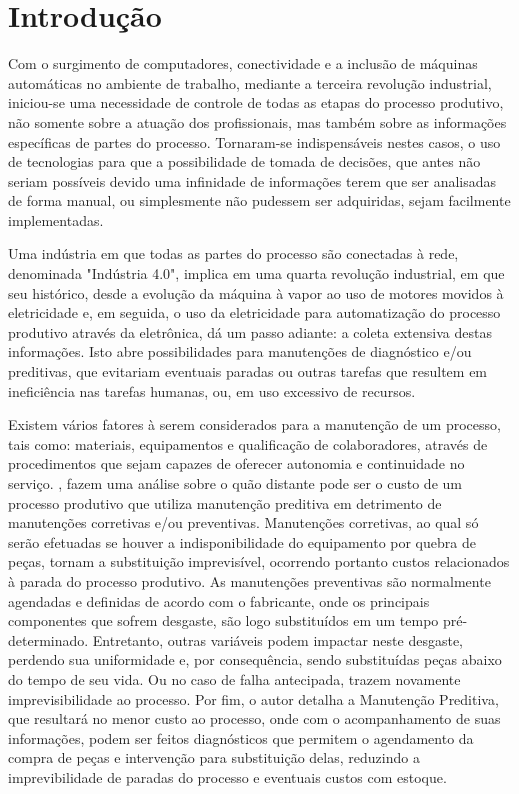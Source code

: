 \chapter{Introdução}
\label{chap:introducao}

Com o surgimento de computadores, conectividade e a inclusão de máquinas automáticas no ambiente de trabalho, mediante a terceira revolução industrial, iniciou-se uma necessidade de controle de todas as etapas do processo produtivo, não somente sobre a atuação dos profissionais, mas também sobre as informações específicas de partes do processo. Tornaram-se indispensáveis nestes casos, o uso de tecnologias para que a possibilidade de tomada de decisões, que antes não seriam possíveis devido uma infinidade de informações terem que ser analisadas de forma manual, ou simplesmente não pudessem ser adquiridas, sejam facilmente implementadas.

Uma indústria em que todas as partes do processo são conectadas à rede, denominada "Indústria 4.0", implica em uma quarta revolução industrial, em que seu histórico, desde a evolução da máquina à vapor ao uso de motores movidos à eletricidade e, em seguida, o uso da eletricidade para automatização do processo produtivo através da eletrônica, dá um passo adiante: a coleta extensiva destas informações. Isto abre possibilidades para manutenções de diagnóstico e/ou preditivas, que evitariam eventuais paradas ou outras tarefas que resultem em ineficiência nas tarefas humanas, ou, em uso excessivo de recursos.

Existem vários fatores à serem considerados para a manutenção de um processo, tais como: materiais, equipamentos e qualificação de colaboradores, através de procedimentos que sejam capazes de oferecer autonomia e continuidade no serviço. , fazem uma análise sobre o quão distante pode ser o custo de um processo produtivo que utiliza manutenção preditiva em detrimento de manutenções corretivas e/ou preventivas. Manutenções corretivas, ao qual só serão efetuadas se houver a indisponibilidade do equipamento por quebra de peças, tornam a substituição imprevisível, ocorrendo portanto custos relacionados à parada do processo produtivo. As manutenções preventivas são normalmente agendadas e definidas de acordo com o fabricante, onde os principais componentes que sofrem desgaste, são logo substituídos em um tempo pré-determinado. Entretanto, outras variáveis podem impactar neste desgaste, perdendo sua uniformidade e, por consequência, sendo substituídas peças abaixo do tempo de seu vida. Ou no caso de falha antecipada, trazem novamente imprevisibilidade ao processo. Por fim, o autor detalha a Manutenção Preditiva, que resultará no menor custo ao processo, onde com o acompanhamento de suas informações, podem ser feitos diagnósticos que permitem o agendamento da compra de peças e intervenção para substituição delas, reduzindo a imprevibilidade de paradas do processo e eventuais custos com estoque.

